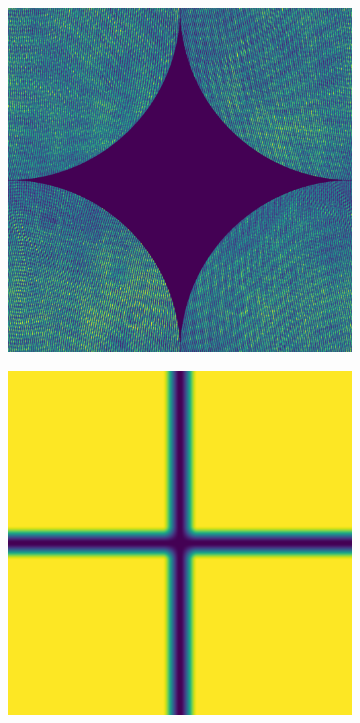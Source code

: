 \begin{figure}
	\begin{subfigure}{0.23\textwidth}
		\centering
		\includegraphics[width=1\linewidth, scale=0.5]{images/puw_data_fftshift.png}
		\caption{}
		\label{fig:puw_data_fftshift}
	\end{subfigure}
	\begin{subfigure}{0.23\textwidth}
		\centering
		\includegraphics[width=1\linewidth, scale=0.5]{images/puw_tukey_window.png}

\end{subfigure}
\end{figure}
